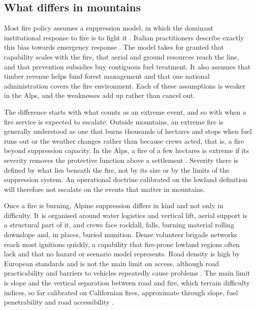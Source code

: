 \documentclass[11pt,a4paper]{article}
\begin{document}
\subsection{What differs in mountains}

Most fire policy assumes a suppression model, in which the dominant institutional response to fire is to fight it \citep{moritz_learning_2014}. Italian practitioners describe exactly this bias towards emergency response \citep{kirschner_governance_2024}. The model takes for granted that capability scales with the fire, that aerial and ground resources reach the line, and that prevention subsidies buy contiguous fuel treatment. It also assumes that timber revenue helps fund forest management and that one national administration covers the fire environment. Each of these assumptions is weaker in the Alps, and the weaknesses add up rather than cancel out.

The difference starts with what counts as an extreme event, and so with when a fire service is expected to escalate. Outside mountains, an extreme fire is generally understood as one that burns thousands of hectares and stops when fuel runs out or the weather changes rather than because crews acted, that is, a fire beyond suppression capacity. In the Alps, a fire of a few hectares is extreme if its severity removes the protective function above a settlement \citep{muller_forest_2020}. Severity there is defined by what lies beneath the fire, not by its size or by the limits of the suppression system. An operational doctrine calibrated on the lowland definition will therefore not escalate on the events that matter in mountains.

Once a fire is burning, Alpine suppression differs in kind and not only in difficulty. It is organised around water logistics and vertical lift, aerial support is a structural part of it, and crews face rockfall, falls, burning material rolling downslope and, in places, buried munition. Dense volunteer brigade networks reach most ignitions quickly, a capability that fire-prone lowland regions often lack and that no hazard or scenario model represents. Road density is high by European standards and is not the main limit on access, although road practicability and barriers to vehicles repeatedly cause problems \citep{muller_forest_2020}. The main limit is slope and the vertical separation between road and fire, which terrain difficulty indices, so far calibrated on Californian fires, approximate through slope, fuel penetrability and road accessibility \citep{cardil_assessing_2025}.
\end{document}
